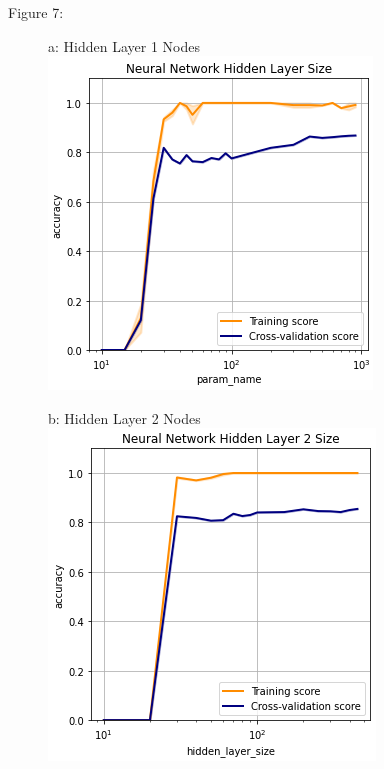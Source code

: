 \documentclass{article}
\begin{document}
\begin{figure}
	\centering
	Figure 7:\\
	\begin{subfigure}{.24\textwidth}
		\centering
		a: Hidden Layer 1 Nodes\\
		\includegraphics[width=\linewidth]{mnist_nn_hidden_layer_size.png}
		
	\end{subfigure}
	\begin{subfigure}{.24\textwidth}
		\centering
		b: Hidden Layer 2 Nodes\\
		\includegraphics[width=\linewidth]{mnist_nn_hidden_layer_2_size.png}
		

\end{subfigure}
\end{figure}
\end{document}
